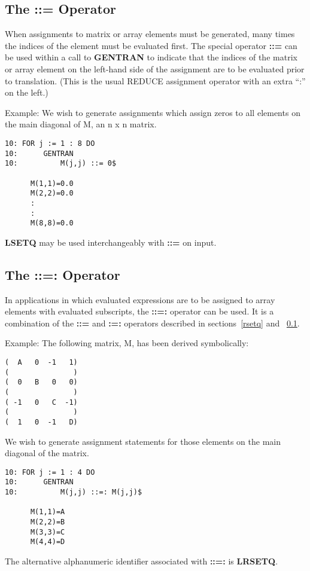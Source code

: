 \subsection{The ::= Operator}
\label{lsetq}
When assignments to matrix or array elements must be generated, many
times the indices of the element must be evaluated first.  The special operator 
{\bf ::=} can be used within a call to {\bf GENTRAN}
to indicate that the indices of the matrix or
array element on the left-hand side of the assignment are to
be evaluated prior to translation.  (This is the usual REDUCE
assignment operator with an extra ``:'' on the left.)
\begin{describe}{Example:}
We wish to generate assignments which assign zeros to all elements
on the main diagonal of M, an n x n matrix.
\begin{verbatim}
10: FOR j := 1 : 8 DO 
10:      GENTRAN 
10:          M(j,j) ::= 0$

      M(1,1)=0.0
      M(2,2)=0.0
      :
      :
      M(8,8)=0.0
\end{verbatim}
\end{describe}
{\bf LSETQ} may be used interchangeably with {\bf ::=} on input.
\subsection{The ::=: Operator}
\label{lrsetq}
In applications in which evaluated expressions are to be assigned to
array elements with evaluated subscripts, the {\bf ::=:} operator can be
used.  It is a combination of the {\bf ::=} and {\bf :=:} operators described
in sections~\ref{rsetq} and ~\ref{lsetq}.
\begin{describe}{Example:}
The following matrix, M, has been derived symbolically:
\begin{verbatim}
(  A   0  -1   1)
(               )
(  0   B   0   0)
(               )
( -1   0   C  -1)
(               )
(  1   0  -1   D)
\end{verbatim}
We wish to generate assignment statements for those elements
on the main diagonal of the matrix.
\begin{verbatim}
10: FOR j := 1 : 4 DO 
10:      GENTRAN 
10:          M(j,j) ::=: M(j,j)$

      M(1,1)=A
      M(2,2)=B
      M(3,3)=C
      M(4,4)=D
\end{verbatim}
\end{describe}
The alternative alphanumeric identifier associated with {\bf ::=:} is 
{\bf LRSETQ}.

